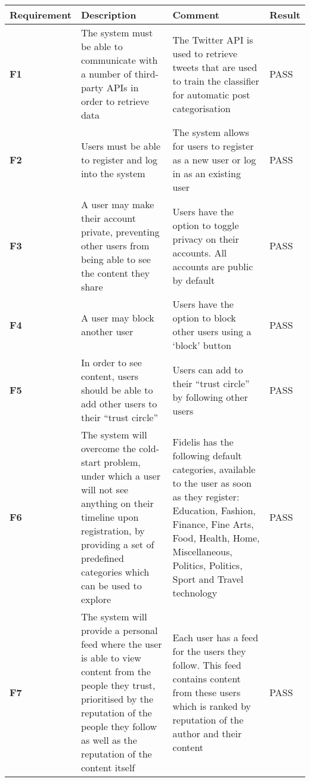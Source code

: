 \begin{longtabu} to \textwidth {XXXX}
\hline
Requirement & Description & Comment & Result \\ 
\hline
\textbf{F1} & The system must be able to communicate with a number of third-party APIs in order to retrieve data & The Twitter API is used to retrieve tweets that are used to train the classifier for automatic post categorisation \vspace{2mm} & \textcolor{passgreen}{PASS} \\
\textbf{F2} & Users must be able to register and log into the system & The system allows for users to register as a new user or log in as an existing user \vspace{2mm} & \textcolor{passgreen}{PASS} \\
\textbf{F3} & A user may make their account private, preventing other users from being able to see the content they share & Users have the option to toggle privacy on their accounts. All accounts are public by default \vspace{2mm} & \textcolor{passgreen}{PASS} \\
\textbf{F4} & A user may block another user & Users have the option to block other users using a `block' button \vspace{2mm} & \textcolor{passgreen}{PASS} \\
\textbf{F5} & In order to see content, users should be able to add other users to their ``trust circle'' \vspace{2mm} & Users can add to their ``trust circle'' by following other users & \textcolor{passgreen}{PASS} \\
\textbf{F6} & The system will overcome the cold-start problem, under which a user will not see anything on their timeline upon registration, by providing a set of predefined categories which can be used to explore &                                                                                            Fidelis has the following default categories, available to the user as soon as they register: Education, Fashion, Finance, Fine Arts, Food, Health, Home, Miscellaneous, Politics, Politics, Sport and Travel technology \vspace{2mm} & \textcolor{passgreen}{PASS}  \\
\textbf{F7} & The system will provide a personal feed where the user is able to view content from the people they trust, prioritised by the reputation of the people they follow as well as the reputation of the content itself  \vspace{2mm} & Each user has a feed for the users they follow. This feed contains content from these users which is ranked by reputation of the author and their content & \textcolor{passgreen}{PASS} \\

\end{longtabu}
